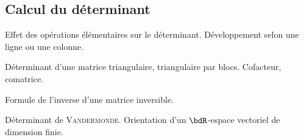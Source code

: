 \documentclass[a4paper,french,bookmarks]{article}
\begin{document}
    \subsection*{Calcul du déterminant}

    \begin{enumerate}
        \ithand Effet des opérations élémentaires sur le déterminant.
        Développement selon une ligne ou une colonne.
        
        \ithand Déterminant d'une matrice triangulaire, triangulaire par blocs. Cofacteur,
        comatrice.
        
        \ithand Formule de l'inverse d'une matrice inversible.
        
        \ithand Déterminant de \textsc{Vandermonde}. Orientation d'un $\bdR$-espace vectoriel
        de dimension finie.
    \end{enumerate}

    \questionsdecours
\end{document}
